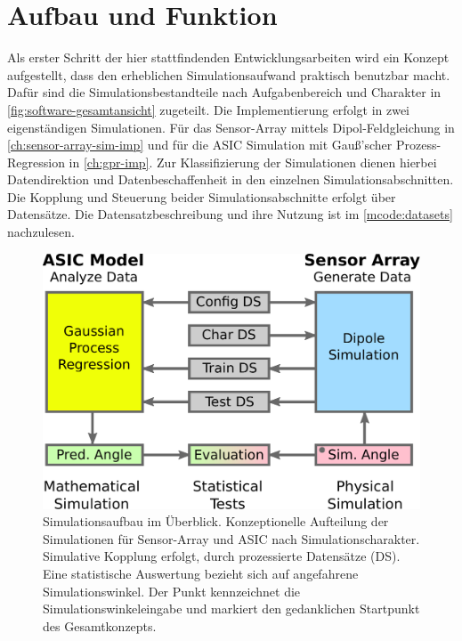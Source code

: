 %


\section{Aufbau und Funktion}\label{sec:aufbau-und-funktion}


Als erster Schritt der hier stattfindenden Entwicklungsarbeiten wird ein Konzept aufgestellt, dass den erheblichen Simulationsaufwand praktisch benutzbar macht. Dafür sind die Simulationsbestandteile nach Aufgabenbereich und Charakter in \autoref{fig:software-gesamtansicht} zugeteilt. Die Implementierung erfolgt in zwei eigenständigen Simulationen. Für das Sensor-Array mittels Dipol-Feldgleichung in \autoref{ch:sensor-array-sim-imp} und für die ASIC Simulation mit Gauß'scher Prozess-Regression in \autoref{ch:gpr-imp}. Zur Klassifizierung der Simulationen dienen hierbei Datendirektion und Datenbeschaffenheit in den einzelnen Simulationsabschnitten. Die Kopplung und Steuerung beider Simulationsabschnitte erfolgt über Datensätze. Die Datensatzbeschreibung und ihre Nutzung ist im \autoref{mcode:datasets} nachzulesen. 


\clearpage


\begin{figure}[htp]
	\centering
	\includegraphics[width=0.7\linewidth]{chapters/images/3-SW-E-OExp/Software-Gesamtansicht}
	\caption[Simulationsaufbau im Überblick]{Simulationsaufbau im Überblick. Konzeptionelle Aufteilung der Simulationen für Sensor-Array und ASIC nach Simulationscharakter. Simulative Kopplung erfolgt, durch prozessierte Datensätze (DS). Eine statistische Auswertung bezieht sich auf angefahrene Simulationswinkel. Der Punkt kennzeichnet die Simulationswinkeleingabe und markiert den gedanklichen Startpunkt des Gesamtkonzepts.}
	\label{fig:software-gesamtansicht}
\end{figure}


